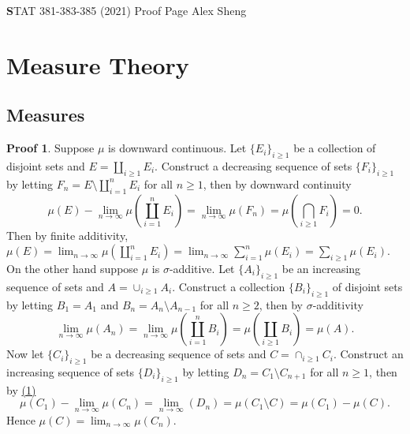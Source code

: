 \documentclass[hidelinks,11pt]{article}
\theoremstyle{definition}
\theoremstyle{dotless}
\newtheorem{prop}{Proof}[section]
\theoremstyle{remark}
\DeclareMathOperator{\1}{\mathbf{1}}
\begin{document}
\begin{center}
{\Large\textbf STAT 381-383-385 (2021) \hspace{0.1cm} Proof Page}\medbreak
\large{Alex Sheng}
\end{center}

\section{Measure Theory}

\subsection{Measures}

\begin{prop}
Suppose $\mu$ is downward continuous. Let $\{E_i\}_{i\geq1}$ be a collection of disjoint sets and $E=\amalg_{i\geq1}E_i$. Construct a decreasing sequence of sets $\{F_i\}_{i\geq1}$ by letting
$F_n=E\setminus\amalg_{i=1}^nE_i$ for all $n\geq1$, then by downward continuity
\[\mu(E)-\lim_{n\to\infty}\mu(\coprod_{i=1}^nE_i)=\lim_{n\to\infty}\mu(F_n)=\mu(\bigcap_{i\geq1}F_i)=0.\]
Then by finite additivity, $\mu(E)=\lim_{n\to\infty}\mu(\amalg_{i=1}^nE_i)=\lim_{n\to\infty}\sum_{i=1}^n\mu(E_i)=\sum_{i\geq1}\mu(E_i)$.\medbreak
On the other hand suppose $\mu$ is $\sigma$-additive.
Let $\{A_i\}_{i\geq1}$ be an increasing sequence of sets and $A=\cup_{i\geq1}A_i$. Construct a collection $\{B_i\}_{i\geq1}$ of disjoint sets by letting $B_1=A_1$ and $B_n=A_n\setminus A_{n-1}$ for all $n\geq2$, then by $\sigma$-additivity
\begin{equation}\label{(1)}
    \lim_{n\to\infty}\mu(A_n)=\lim_{n\to\infty}\mu(\coprod_{i=1}^nB_i)=\mu(\coprod_{i\geq1}B_i)=\mu(A).
\end{equation}
Now let $\{C_i\}_{i\geq1}$ be a decreasing sequence of sets and $C=\cap_{i\geq1}C_i$. Construct an increasing sequence of sets $\{D_i\}_{i\geq1}$ by letting $D_n=C_1\setminus C_{n+1}$ for all $n\geq1$, then by \hyperref[(1)]{(1)}
\[\mu(C_1)-\lim_{n\to\infty}\mu(C_n)=\lim_{n\to\infty}(D_n)=\mu(C_1\setminus C)=\mu(C_1)-\mu(C).\]
Hence $\mu(C)=\lim_{n\to\infty}\mu(C_n)$.
\end{prop}
\end{document}
